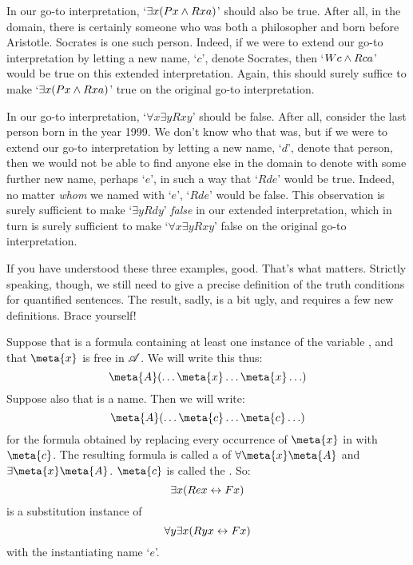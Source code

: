 In our go-to interpretation, `$\exists x (Px \wedge Rxa)$' should also be true. After all, in the domain, there is certainly someone who was both a philosopher and born before Aristotle. Socrates is one such person. Indeed, if we were to extend our go-to interpretation by letting a new name, `$c$', denote Socrates, then `$Wc \wedge Rca$' would be true on this extended interpretation. Again, this should surely suffice to make `$\exists x (Px \wedge Rxa)$' true on the original go-to interpretation. 

In our go-to interpretation, `$\forall x \exists y Rxy$' should be false. After all, consider the last person born in the year 1999. We don't know who that was, but if we were to extend our go-to interpretation by letting a new name, `$d$', denote that person, then we would not be able to find anyone else in the domain to denote with some further new name, perhaps `$e$', in such a way that `$Rde$' would be true. Indeed, no matter \emph{whom} we named with `$e$', `$Rde$' would be false. This observation is surely sufficient to make `$\exists y Rdy$' \emph{false} in our extended interpretation, which in turn is surely sufficient to make `$\forall x \exists y Rxy$' false on the original go-to interpretation.

If you have understood these three examples, good. That's what matters. Strictly speaking, though, we still need to give a precise definition of the truth conditions for quantified sentences. The result, sadly, is a bit ugly, and requires a few new definitions. Brace yourself!

Suppose that  is a formula containing at least one instance of the variable , and that $\meta{x}$ is free in $\mathscr{A}$. We will write this thus:
$$\meta{A}(\ldots \meta{x} \ldots \meta{x} \ldots)$$
Suppose also that  is a name. Then we will write:
$$\meta{A}(\ldots \meta{c} \ldots \meta{c} \ldots)$$
for the formula obtained by replacing every occurrence of $\meta{x}$ in  with $\meta{c}$. The resulting formula is called a  of $\forall \meta{x}\meta{A}$ and $\exists\meta{x}\meta{A}$.  $\meta{c}$ is called the . So:
	$$\exists x (Rex \leftrightarrow Fx)$$
is a substitution instance of 
	$$\forall y \exists x (Ryx \leftrightarrow Fx)$$
with the instantiating name `$e$'.

